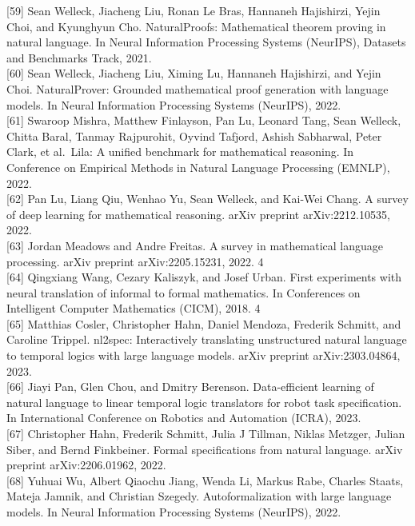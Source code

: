 \documentclass[
]{article}
\begin{document}
{[}59{]} Sean Welleck, Jiacheng Liu, Ronan Le Bras, Hannaneh Hajishirzi,
Yejin Choi, and Kyunghyun Cho. NaturalProofs: Mathematical theorem
proving in natural language. In Neural Information Processing Systems
(NeurIPS), Datasets and Benchmarks Track, 2021.\\
{[}60{]} Sean Welleck, Jiacheng Liu, Ximing Lu, Hannaneh Hajishirzi, and
Yejin Choi. NaturalProver: Grounded mathematical proof generation with
language models. In Neural Information Processing Systems (NeurIPS),
2022.\\
{[}61{]} Swaroop Mishra, Matthew Finlayson, Pan Lu, Leonard Tang, Sean
Welleck, Chitta Baral, Tanmay Rajpurohit, Oyvind Tafjord, Ashish
Sabharwal, Peter Clark, et al.~Lila: A unified benchmark for
mathematical reasoning. In Conference on Empirical Methods in Natural
Language Processing (EMNLP), 2022.\\
{[}62{]} Pan Lu, Liang Qiu, Wenhao Yu, Sean Welleck, and Kai-Wei Chang.
A survey of deep learning for mathematical reasoning. arXiv preprint
arXiv:2212.10535, 2022.\\
{[}63{]} Jordan Meadows and Andre Freitas. A survey in mathematical
language processing. arXiv preprint arXiv:2205.15231, 2022. 4\\
{[}64{]} Qingxiang Wang, Cezary Kaliszyk, and Josef Urban. First
experiments with neural translation of informal to formal mathematics.
In Conferences on Intelligent Computer Mathematics (CICM), 2018. 4\\
{[}65{]} Matthias Cosler, Christopher Hahn, Daniel Mendoza, Frederik
Schmitt, and Caroline Trippel. nl2spec: Interactively translating
unstructured natural language to temporal logics with large language
models. arXiv preprint arXiv:2303.04864, 2023.\\
{[}66{]} Jiayi Pan, Glen Chou, and Dmitry Berenson. Data-efficient
learning of natural language to linear temporal logic translators for
robot task specification. In International Conference on Robotics and
Automation (ICRA), 2023.\\
{[}67{]} Christopher Hahn, Frederik Schmitt, Julia J Tillman, Niklas
Metzger, Julian Siber, and Bernd Finkbeiner. Formal specifications from
natural language. arXiv preprint arXiv:2206.01962, 2022.\\
{[}68{]} Yuhuai Wu, Albert Qiaochu Jiang, Wenda Li, Markus Rabe, Charles
Staats, Mateja Jamnik, and Christian Szegedy. Autoformalization with
large language models. In Neural Information Processing Systems
(NeurIPS), 2022.\\
\end{document}
